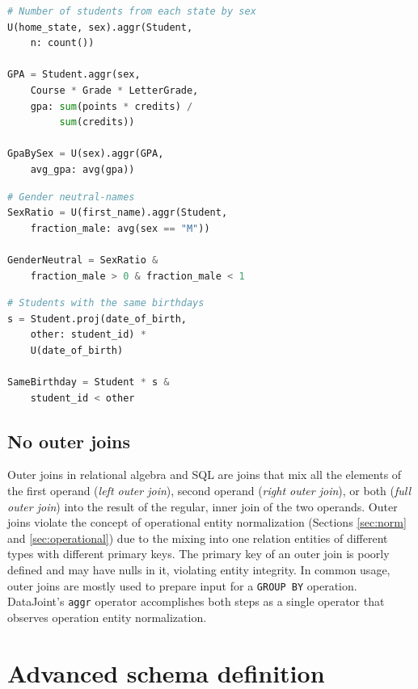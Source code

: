 \documentclass[letter,10pt]{article}
\newcommand{\datajoint}{DataJoint\xspace}
\begin{document}
\begin{lstlisting}[language=Python, morekeywords={avg, U}, caption={Aggregation by a new entity.}, label={lst:u2}]
# Number of students from each state by sex
U(home_state, sex).aggr(Student, 
    n: count())

GPA = Student.aggr(sex,
    Course * Grade * LetterGrade,
    gpa: sum(points * credits) /
         sum(credits))

GpaBySex = U(sex).aggr(GPA, 
    avg_gpa: avg(gpa))
\end{lstlisting}

\begin{lstlisting}[language=Python, morekeywords={avg, U}, caption={Aggregation and restriction.}, label={lst:u3}]
# Gender neutral-names
SexRatio = U(first_name).aggr(Student, 
    fraction_male: avg(sex == "M")) 

GenderNeutral = SexRatio & 
    fraction_male > 0 & fraction_male < 1
\end{lstlisting}

\begin{lstlisting}[language=Python, morekeywords={avg, U}, caption={Elevation of a secondary attribute.}, label={lst:u4} ]
# Students with the same birthdays
s = Student.proj(date_of_birth, 
    other: student_id) * 
    U(date_of_birth)

SameBirthday = Student * s & 
    student_id < other
\end{lstlisting}

\subsection{No outer joins}
Outer joins in relational algebra and SQL are joins that mix  all the elements  of the first operand (\emph{left outer join}), second operand (\emph{right outer join}), or both (\emph{full outer join}) into the result of the regular, inner join of the two operands. 
Outer joins violate the concept of operational entity normalization (Sections \ref{sec:norm} and \ref{sec:operational}) due to the mixing into one relation entities of different types with different primary keys.
The primary key of an outer join is poorly defined and may have nulls in it, violating entity integrity.
In common usage, outer joins are mostly used to prepare input for a \lstinline$GROUP BY$ operation. 
\datajoint's \lstinline$aggr$ operator accomplishes both steps as a single operator that observes operation entity normalization.


\section{Advanced schema definition}\label{sec:def2}
\end{document}
